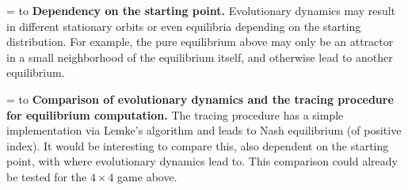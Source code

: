 \documentclass[a4paper,12pt]{article}  %
\def\rmitem#1{\par\hangafter=1\hangindent=\einr
  \noindent\hbox to\einr{\ignorespaces#1\hfill}\ignorespaces}
\newcommand\bullitem{\rmitem{\raise.17ex\hbox{\kern7pt\scriptsize$\bullet$}}}
\theoremstyle{definition}
\begin{document}
\bullitem
\textbf{Dependency on the starting point.}
Evolutionary dynamics may result in different stationary
orbits or even equilibria depending on the starting
distribution.
For example, the pure equilibrium above may only be an
attractor in a small neighborhood of the equilibrium itself,
and otherwise lead to another equilibrium.

\bullitem
\textbf{Comparison of evolutionary dynamics and the tracing
procedure for equilibrium computation.}
The tracing procedure has a simple implementation via
Lemke's algorithm and leads to Nash equilibrium (of positive
index). 
It would be interesting to compare this, also dependent on
the starting point, with where evolutionary dynamics lead
to.
This comparison could already be tested for the $4\times 4$
game above.
\end{document}
